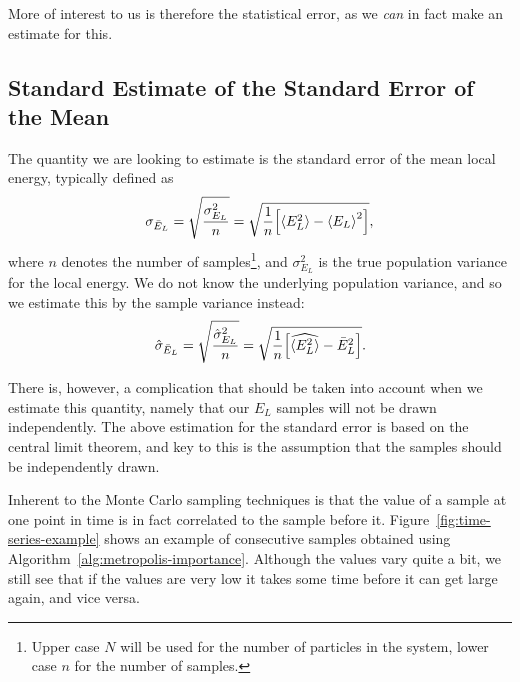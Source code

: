\documentclass[a4paper, 11pt]{article}
\begin{document}
\begin{multicols}{2}
More of interest to us is therefore the statistical error, as we \textit{can} in
fact make an estimate for this. 

\subsection{Standard Estimate of the Standard Error of the Mean}

The quantity we are looking to estimate is the
standard error of the mean local energy, typically defined as
\begin{align}
    \sigma_{\bar E_L} = \sqrt{\frac{\sigma_{E_L}^2}{n}}= \sqrt{\frac{1}{n}
    \qty[\expval{E_L^2} - \expval{E_L}^2]} \label{eq:SE-def},
\end{align}
where $n$ denotes the number of samples\footnote{Upper case $N$ will be used for
the number of particles in the system, lower case $n$ for the number of
samples.}, and $\sigma_{E_L}^2$ is the true population variance for the local energy. We
do not know the underlying population variance, and so we estimate this by the
sample variance instead:
\begin{align}
    \hat\sigma_{\bar E_L} = \sqrt{\frac{\hat\sigma_{E_L}^2}{n}}=
    \sqrt{\frac{1}{n}
    \qty[\widehat{\expval{E_L^2}} - \bar{E}_L^2]}
    \label{eq:SE-est-def}.
\end{align}

There is, however, a complication that should be taken into account when we
estimate this quantity, namely that our $E_L$ samples will not be drawn
independently. The above estimation for the standard error is based on the
central limit theorem, and key to this is the assumption that the samples should
be independently drawn. 

Inherent to the Monte Carlo sampling techniques is that the value
of a sample at one point in time is in fact correlated to the sample before it.
Figure~\ref{fig:time-series-example} shows an example of consecutive samples
obtained using Algorithm~\ref{alg:metropolis-importance}. Although the values
vary quite a bit, we still see that if the values are very low it takes some
time before it can get large again, and vice versa.

\end{multicols}
\end{document}
